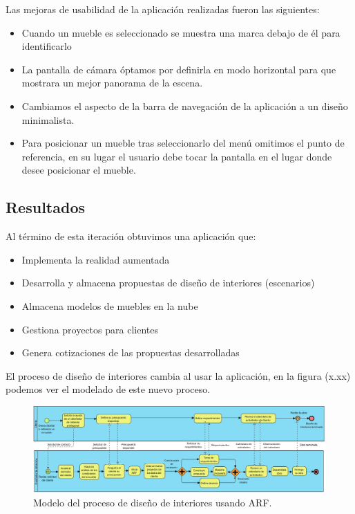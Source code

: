 Las mejoras de usabilidad de la aplicación realizadas fueron las siguientes:
\begin{itemize}
	\item Cuando un mueble es seleccionado se muestra una marca debajo de él para identificarlo
	\item La pantalla de cámara óptamos por definirla en modo horizontal para que mostrara un mejor panorama de la escena.
	\item Cambiamos el aspecto de la barra de navegación de la aplicación a un diseño minimalista.
	\item Para posicionar un mueble tras seleccionarlo del menú omitimos el punto de referencia, en su lugar el usuario debe tocar la pantalla en el lugar donde desee posicionar el mueble.
\end{itemize}

\subsection{Resultados}
Al término de esta iteración obtuvimos una aplicación que:
\begin{itemize}
	\item Implementa la realidad aumentada
	\item Desarrolla y almacena propuestas de diseño de interiores (escenarios)
	\item Almacena modelos de muebles en la nube
	\item Gestiona proyectos para clientes
	\item Genera cotizaciones de las propuestas desarrolladas
\end{itemize}

El proceso de diseño de interiores cambia al usar la aplicación, en la figura (x.xx) podemos ver el modelado de este nuevo proceso.
\begin{figure}[!htbp]
	\centering
	\includegraphics[width=20cm,angle=270,origin=c]{imagenes/desarrollo/diagramas/NPMN_FINAL_ID.jpg}
	\caption{Modelo del proceso de diseño de interiores usando ARF.}
	\label{fig:bpmnarf}
\end{figure}